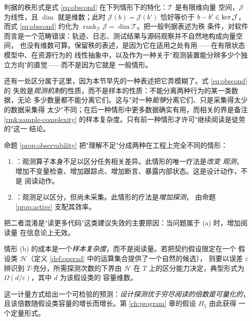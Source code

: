 判据的秩形式是式 \eqref{eq:obscond} 在下列情形下的特化：$\mathcal{T}$ 是有限维向量
空间，$\mathcal{J}$ 为线性，且 $\dim$ 就是维数；此时 $\mathcal{J}(b) = \mathcal{J}(b')$
恰好等价于 $b - b' \in \operatorname{ker} \mathcal{J}$，而式 \eqref{eq:obscond} 约化为
$\operatorname{rank}_{\mathcal{T}}\mathcal{J} = \dim \mathcal{T}$。把一般判据表述为秩
条件，对软件而言是一个范畴错误：轨迹、日志、测试结果与源码观察并不自然地构成向量空间，
也没有维数可算。保留秩的表述，是因为它在适用之处有用——在有限状态模型中、在资源行为的
线性抽象中，以及作为一种关于"观测装置能分辨多少个独立方向"的直觉——而不是因为它就是
一般情形。

还有一处区分属于这里，因为本节早先的一种表述把它弄模糊了。式 \eqref{eq:obscond} 的
失败是\emph{观测机制}的性质，而不是样本的性质：不能分离两种行为的某一类数据，无论
多少数量都不能分离它们。这与"对一种\emph{能够}分离它们、只是采集得太少的数据采集得
太少"不同；在后一种情形中更多数据确实有用，而相关的界是备注
\ref{rmk:sample-complexity} 的样本复杂度。只有前一种情形才许可"继续阅读是徒劳的"这一
结论。

命题 \ref{prop:observability} 把"理解不足"分成两种在工程上完全不同的情形：

\begin{principle}[两种理解失败的区分]\label{pr:two-failures}
\begin{enumerate}[label=(\alph*)]
\item {}：观测算子本身不足以区分任务相关差异。此情形的唯一疗法是\emph{改变
      观测}，增加不变量检查、增加跟踪点、增加断言、暴露内部状态。这是设计动作，不是
      阅读动作。
\item {}：观测足以区分，但尚未采集。此情形的疗法是\emph{增加探测}，
      由命题 \ref{prop:active} 支配其效率。
\end{enumerate}
把二者混淆是"读更多代码"这类建议失效的主要原因：当问题属于 (a) 时，增加阅读量
在信息论上无效。
\end{principle}

\begin{remark}[理解成本的正确计量]\label{rmk:sample-complexity}
情形 (b) 的成本是一个\emph{样本复杂度}，而不是阅读量。若把契约假设限定在一个
假设类 $\mathcal{H}$（定义 \ref{def:operad} 中的运算集合提供了一个自然的候选），
则要以误差 $\varepsilon$ 辨识到 $T$-充分，所需探测次数的下界由 $\mathcal{H}$ 在 $T$
上的区分能力决定，典型形式为 $\Omega(d/\varepsilon)$，其中 $d$ 为该假设类的
容量维数。

这一计量方式给出一个可检验的预测：\emph{设计探测优于穷尽阅读的倍数是可量化的}，
且该倍数随假设类容量的增长而增长。第 \ref{ch:program} 章的假设 $H_5$ 由此获得
一个定量形式。
\end{remark}

